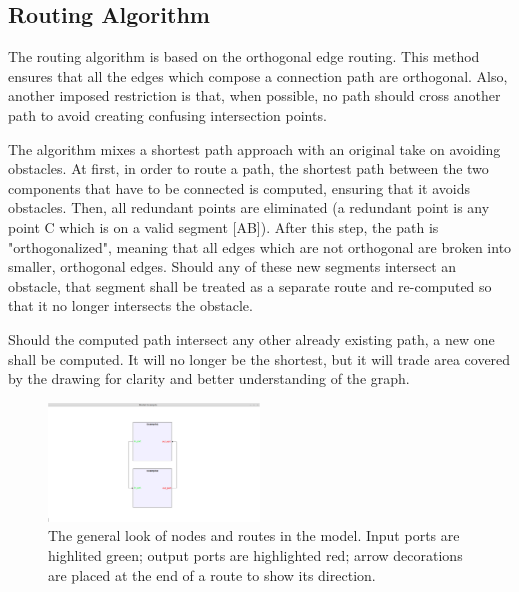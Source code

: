\subsection{Routing Algorithm}

The routing algorithm is based on the orthogonal edge routing. This method ensures 
that all the edges which compose a connection path are orthogonal. Also, another 
imposed restriction is that, when possible, no path should cross another path to 
avoid creating confusing intersection points.

The algorithm mixes a shortest path approach with an original take on avoiding obstacles.
At first, in order to route a path, the shortest path between the two components that have 
to be connected is computed, ensuring that it avoids obstacles. Then, all redundant points 
are eliminated (a redundant point is any point C which is on a valid segment [AB]). After 
this step, the path is "orthogonalized", meaning that all edges which are not orthogonal are 
broken into smaller, orthogonal edges. Should any of these new segments intersect an obstacle,
that segment shall be treated as a separate route and re-computed so that it no longer 
intersects the obstacle.

Should the computed path intersect any other already existing path, a new one shall be 
computed. It will no longer be the shortest, but it will trade area covered by the drawing 
for clarity and better understanding of the graph.

\begin{figure}[ht] \centering
\includegraphics[width=0.5\textwidth]{src/modelExample.png}
\caption{The general look of nodes and routes in the model. Input ports are highlited green; output ports are highlighted red; arrow decorations are placed 
at the end of a route to show its direction.} \end{figure}
